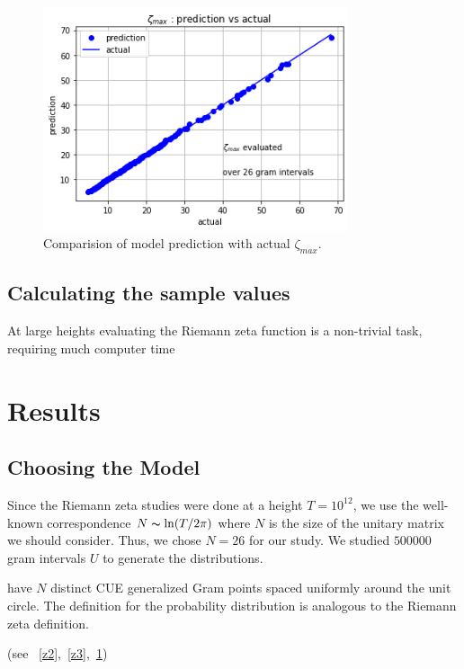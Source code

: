 \documentclass[twoside]{article}
\begin{document}
\begin{figure}
\centering
\includegraphics[width=0.8\textwidth]{4.png}
\caption[]{ 
  Comparision of model prediction with actual $\zeta_{max}$. 
  }
\vspace{1mm}
\label{z4}
\end{figure}

\subsection{\label{seccalc}Calculating the sample values}

At large heights evaluating the Riemann zeta function  is a non-trivial task, requiring much computer time 

\section{\label{sec3}Results}

\subsection{\label{sec3.1} Choosing the Model}

Since the Riemann zeta studies were done at a
height $T = 10^{12}$, we use the well-known correspondence $N \thicksim \ln(T/2\pi)$ where $N$ 
is the size of the unitary matrix we should consider. Thus, we chose $N = 26$ for our
study.  We studied $500000$ gram intervals $U$ to generate the distributions.

have $N$ distinct CUE generalized Gram points spaced uniformly
around the unit circle.
The definition for the probability distribution is analogous to the Riemann zeta definition.

 (see ~\ref{z2},~\ref{z3},~\ref{z4}) 
\end{document}
